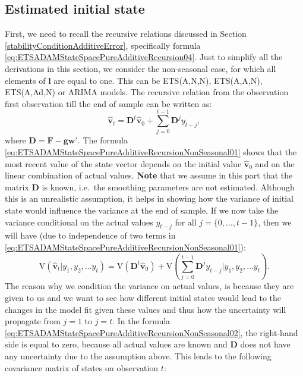 \documentclass[
]{book}
\theoremstyle{definition}
\theoremstyle{definition}
\theoremstyle{definition}
\theoremstyle{definition}
\theoremstyle{remark}
\begin{document}
\hypertarget{estimated-initial-state}{%
\subsection{Estimated initial state}\label{estimated-initial-state}}

First, we need to recall the recursive relations discussed in Section \ref{stabilityConditionAdditiveError}, specifically formula \eqref{eq:ETSADAMStateSpacePureAdditiveRecursion04}. Just to simplify all the derivations in this section, we consider the non-seasonal case, for which all elements of \(\boldsymbol{l}\) are equal to one. This can be ETS(A,N,N), ETS(A,A,N), ETS(A,Ad,N) or ARIMA models. The recursive relation from the observation first observation till the end of sample can be written as:
\begin{equation}
    \hat{\mathbf{v}}_{t} = \mathbf{D}^{t} \hat{\mathbf{v}}_{0} + \sum_{j=0}^{t-1} \mathbf{D}^{j} y_{t - j} ,
  \label{eq:ETSADAMStateSpacePureAdditiveRecursionNonSeasonal01}
\end{equation}
where \(\mathbf{D}=\mathbf{F} - \mathbf{g}\mathbf{w}'\). The formula \eqref{eq:ETSADAMStateSpacePureAdditiveRecursionNonSeasonal01} shows that the most recent value of the state vector depends on the initial value \(\hat{\mathbf{v}}_{0}\) and on the linear combination of actual values. \textbf{Note} that we assume in this part that the matrix \(\mathbf{D}\) is known, i.e.~the smoothing parameters are not estimated. Although this is an unrealistic assumption, it helps in showing how the variance of initial state would influence the variance at the end of sample. If we now take the variance conditional on the actual values \(y_{t - j}\) for all \(j=\{0, \dots, t-1 \}\), then we will have (due to independence of two terms in \eqref{eq:ETSADAMStateSpacePureAdditiveRecursionNonSeasonal01}):
\begin{equation}
    \mathrm{V}(\hat{\mathbf{v}}_{t} | y_1, y_2, \dots y_t) = \mathrm{V}\left( \mathbf{D}^{t} \hat{\mathbf{v}}_{0} \right) + \mathrm{V}\left(\sum_{j=0}^{t-1} \mathbf{D}^{j} y_{t - j} | y_1, y_2, \dots y_t \right) .
  \label{eq:ETSADAMStateSpacePureAdditiveRecursionNonSeasonal02}
\end{equation}
The reason why we condition the variance on actual values, is because they are given to us and we want to see how different initial states would lead to the changes in the model fit given these values and thus how the uncertainty will propagate from \(j=1\) to \(j=t\). In the formula \eqref{eq:ETSADAMStateSpacePureAdditiveRecursionNonSeasonal02}, the right-hand side is equal to zero, because all actual values are known and \(\mathbf{D}\) does not have any uncertainty due to the assumption above. This leads to the following covariance matrix of states on observation \(t\):
\end{document}
